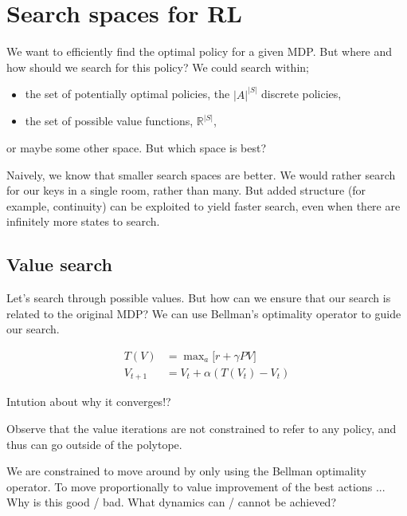 \section{Search spaces for RL}

We want to efficiently find the optimal policy for a given MDP. But where and how should we
search for this policy? We could search within;

\begin{itemize}
\tightlist
\item
the set of potentially optimal policies, the \(|A|^{|S|}\) discrete policies,
\item
the set of possible value functions, \(\mathbb R^{|S|}\),
\end{itemize}
or maybe some other space. But which space is best?

Naively, we know that smaller search spaces are better. We would rather
search for our keys in a single room, rather than many. But added
structure (for example, continuity) can be exploited to yield faster
search, even when there are infinitely more states to search.


\subsection{Value search}

Let's search through possible values. But how can we ensure that our search is
related to the original MDP? We can use Bellman's optimality operator to guide our search.


\begin{align}
T(V) &= \mathop{\text{max}}_a \big[r + \gamma PV\big] \\
V_{t+1} &= V_t + \alpha (T(V_t) - V_t)
\end{align}

Intution about why it converges!?


Observe that the value iterations are not constrained to refer to any policy,
and thus can go outside of the polytope. \cite{Dadashi2018}

We are constrained to move around by only using the Bellman optimality operator.
To move proportionally to value improvement of the best actions ...
Why is this good / bad. What dynamics can / cannot be achieved?

